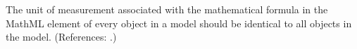 The unit of measurement associated with the mathematical formula in the
MathML  element of every \KineticLaw object in a model should
be identical to all \KineticLaw objects in the model.  (References: .)
